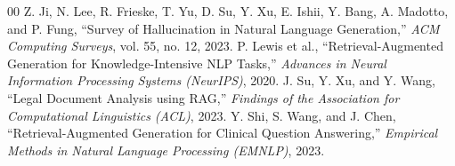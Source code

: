 \documentclass[conference]{IEEEtran}
\begin{document}
\begin{thebibliography}{00}
 Z. Ji, N. Lee, R. Frieske, T. Yu, D. Su, Y. Xu, E. Ishii, Y. Bang, A. Madotto, and P. Fung, ``Survey of Hallucination in Natural Language Generation,'' \emph{ACM Computing Surveys}, vol. 55, no. 12, 2023.
 P. Lewis et al., ``Retrieval-Augmented Generation for Knowledge-Intensive NLP Tasks,'' \emph{Advances in Neural Information Processing Systems (NeurIPS)}, 2020.
 J. Su, Y. Xu, and Y. Wang, ``Legal Document Analysis using RAG,'' \emph{Findings of the Association for Computational Linguistics (ACL)}, 2023.
 Y. Shi, S. Wang, and J. Chen, ``Retrieval-Augmented Generation for Clinical Question Answering,'' \emph{Empirical Methods in Natural Language Processing (EMNLP)}, 2023.
\end{thebibliography}
\end{document}
